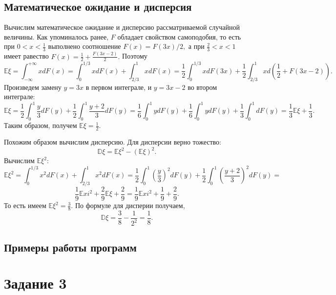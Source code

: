 \documentclass[11pt]{article}
\numberwithin{equation}{section}
\begin{document}
\subsection{Математическое ожидание и дисперсия}

Вычислим математическое ожидание и дисперсию рассматриваемой случайной величины. Как упоминалось ранее,
$F$ обладает свойством самоподобия, то есть при $0 < x < \frac{1}{3}$
выполнено соотношение $F(x) = F(3x)/2,$ а при $\frac{2}{3} < x < 1$ имеет равество 
$F(x) = \frac{1}{2} + \frac{F(3x-2)}{2}.$ Поэтому 
$$ \mathbb{E} \xi = \int_{-\infty}^{+\infty}x dF(x) = \int_{0}^{1/3}x dF(x)+ \int_{2/3}^{1}x dF(x) = \frac{1}{2} \int_{0}^{1/3}xdF(3x) + \frac{1}{2} \int_{2/3}^{1}xd(\frac{1}{2}+F(3x-2)).$$
Произведем замену $y=3x$ в первом интеграле, и $y=3x-2$ во втором интеграле:
$$ \mathbb{E} \xi = \frac{1}{2} \int_{0}^{1}\frac{y}{3} dF(y) + \frac{1}{2} \int_{0}^{1} \frac{y+2}{3} dF(y) = \frac{1}{6} \int_0^1ydF(y) +  \frac{1}{6} \int_0^1ydF(y) + \frac{1}{3} \int_0^{1}dF(y) = \frac{1}{3}\mathbb{E}\xi+\frac{1}{3}.$$
Таким образом, получем $\mathbb{E}\xi = \frac{1}{2}.$

Похожим образом вычислим дисперсию.
Для дисперсии верно тожество:
$$ \mathbb{D}\xi = \mathbb{E}\xi^2-(\mathbb{E}\xi)^2.$$
Вычислим $\mathbb{E}\xi^2$:
$$\mathbb{E}\xi^2 = \int_{0}^{1/3}x^2dF(x) + \int_{2/3}^1 x^2 dF(x) = \frac{1}{2} \int_0^1(\frac{y}{3})^2dF(y) + \frac{1}{2} \int_0^1(\frac{y+2}{3})^2dF(y)=$$
$$ \frac{1}{9} \mathbb{E}xi^2 + \frac{2}{9}\mathbb{E}\xi+\frac{2}{9}= \frac{1}{9} \mathbb{E}xi^2+\frac{1}{9}+\frac{2}{9}.$$
То есть имеем $\mathbb{E}\xi^2 = \frac{3}{8}.$ По формуле для дисперии получаем, 
$$ \mathbb{D}\xi = \frac{3}{8}-\frac{1}{2^2} = \frac{1}{8}.$$
\subsection{Примеры работы программ}

\section{Задание 3}
\end{document}
